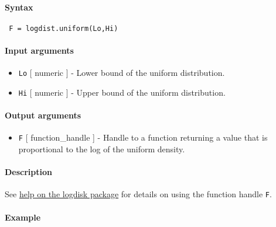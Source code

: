 


	\paragraph{Syntax}
 
 \begin{verbatim}
 F = logdist.uniform(Lo,Hi)
 \end{verbatim}
 
 \paragraph{Input arguments}
 
 \begin{itemize}
 \item
   \texttt{Lo} {[} numeric {]} - Lower bound of the uniform distribution.
 \item
   \texttt{Hi} {[} numeric {]} - Upper bound of the uniform distribution.
 \end{itemize}
 
 \paragraph{Output arguments}
 
 \begin{itemize}
 \item
   \texttt{F} {[} function\_handle {]} - Handle to a function returning a
   value that is proportional to the log of the uniform density.
 \end{itemize}
 
 \paragraph{Description}
 
 See \href{logdist/Contents}{help on the logdisk package} for details on
 using the function handle \texttt{F}.
 
 \paragraph{Example}


